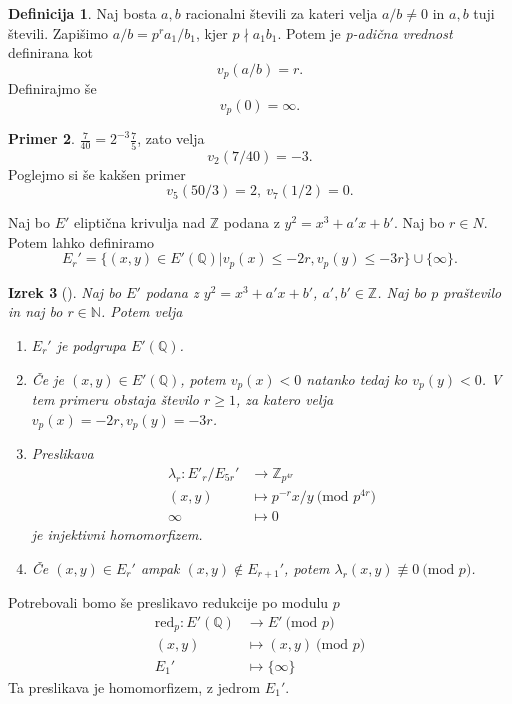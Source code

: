 \documentclass[12pt,a4paper,twoside]{article}
\theoremstyle{definition} %
\newtheorem{definicija}{Definicija}[section]
\newtheorem{primer}[definicija]{Primer}
\theoremstyle{plain} %
\newtheorem{izrek}[definicija]{Izrek}
\numberwithin{equation}{section}  %
\newcommand{\N}{\mathbb N}
\newcommand{\Z}{\mathbb Z}
\newcommand{\Q}{\mathbb Q}
\newcommand{\MOD}[1]{\ \text{(mod }{#1}\text{)}}
\begin{document}
\begin{definicija}
Naj bosta $a,b$ racionalni števili za kateri velja $a/b \neq 0$ in $a,b$ tuji števili. Zapišimo $a/b = p^ra_1/b_1$, kjer $p \nmid a_1b_1$. Potem je \emph{p-adična vrednost} definirana
kot
$$v_p(a/b) = r.$$
Definirajmo še
$$v_p(0) = \infty.$$
\end{definicija}

\begin{primer}
$\frac{7}{40} = 2^{-3}\frac{7}{5}$, zato velja
$$v_2(7/40) = -3.$$
Poglejmo si še kakšen primer
$$v_5(50/3) = 2,\ v_7(1/2) = 0.$$
\end{primer}

Naj bo $E'$ eliptična krivulja nad $\Z$ podana z $y^2 = x^3+a'x+b'$. Naj bo $r \in N$. Potem lahko definiramo
$$E_r' = \{  (x,y) \in E'(\Q) | v_p(x) \leq -2r, v_p(y) \leq -3r \} \cup \{ \infty \}.$$

\begin{izrek}[]
Naj bo $E'$ podana z $y^2 = x^3+a'x+b'$, $a',b' \in \Z$. Naj bo $p$ praštevilo in naj bo $r \in \N$. Potem velja
\begin{enumerate}

\item $E_r'$ je podgrupa $E'(\Q)$.
\item Če je $(x,y) \in E'(\Q)$, potem $v_p(x)<0$ natanko tedaj ko $v_p(y) <0$. V tem primeru obstaja število $r \geq 1$, za katero velja $v_p(x) = -2r, v_p(y) = -3r$.
\item Preslikava
\begin{align}
\lambda_r: E'_r/E_{5r}' &{}\rightarrow \Z_{p^{4r}} \nonumber \\
(x,y) &{}\mapsto p^{-r}x/y \MOD{p^{4r}} \nonumber \\
\infty &{}\mapsto 0 \nonumber
\end{align}
je injektivni homomorfizem.
\item Če $(x,y) \in E_r'$ ampak $(x,y) \not \in E_{r+1}'$, potem $\lambda_r(x,y) \not \equiv 0 \MOD{p}$.

\end{enumerate}
\end{izrek}

Potrebovali bomo še preslikavo redukcije po modulu $p$
\begin{align}
\text{red}_p: E'(\Q) &{}\rightarrow E' \MOD{p} \nonumber \\
(x,y) &{}\mapsto (x,y) \MOD{p} \nonumber \\
E_1' &{}\mapsto \{ \infty \} \nonumber
\end{align}
Ta preslikava je homomorfizem, z jedrom $E_1'$.
\end{document}
